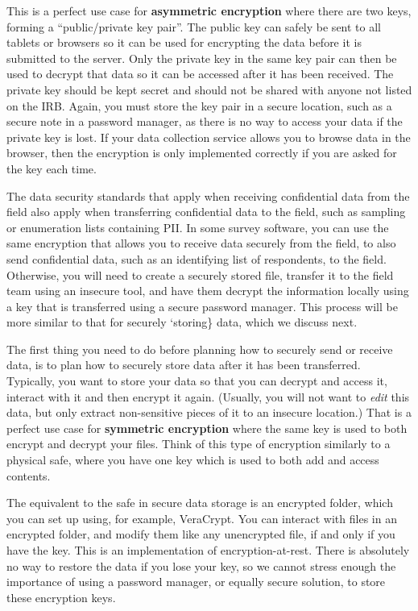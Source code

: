\documentclass[
]{book}
\begin{document}
This is a perfect use case for \textbf{asymmetric encryption}
where there are two keys, forming a ``public/private key pair''.
The public key can safely be sent to all tablets or browsers
so it can be used for encrypting the data before it is submitted to the server.
Only the private key in the same key pair can then be used to decrypt that data
so it can be accessed after it has been received.
The private key should be kept secret and
should not be shared with anyone not listed on the IRB.
Again, you must store the key pair in a secure location,
such as a secure note in a password manager,
as there is no way to access your data if the private key is lost.
If your data collection service allows you to browse data in the browser,
then the encryption is only implemented correctly if you are asked for the key each time.

The data security standards that apply
when receiving confidential data from the field
also apply when transferring confidential data to the field,
such as sampling or enumeration lists containing PII.
In some survey software,
you can use the same encryption that allows you to receive data securely
from the field, to also send confidential data,
such as an identifying list of respondents, to the field.
Otherwise, you will need to create a securely stored file,
transfer it to the field team using an insecure tool,
and have them decrypt the information locally
using a key that is transferred using a secure password manager.
This process will be more similar to that for securely `storing\} data,
which we discuss next.

The first thing you need to do before planning how to securely send or receive data,
is to plan how to securely store data after it has been transferred.
Typically, you want to store your data so that you can decrypt and access it,
interact with it and then encrypt it again.
(Usually, you will not want to \emph{edit} this data,
but only extract non-sensitive pieces of it to an insecure location.)
That is a perfect use case for \textbf{symmetric encryption}
where the same key is used to both encrypt and decrypt your files.
Think of this type of encryption similarly to a physical safe,
where you have one key which is used to both add and access contents.

The equivalent to the safe in secure data storage is an encrypted folder,
which you can set up using, for example, VeraCrypt.
You can interact with files in an encrypted folder,
and modify them like any unencrypted file,
if and only if you have the key.
This is an implementation of encryption-at-rest.
There is absolutely no way to restore the data if you lose your key,
so we cannot stress enough the importance of using a password manager,
or equally secure solution, to store these encryption keys.
\end{document}
